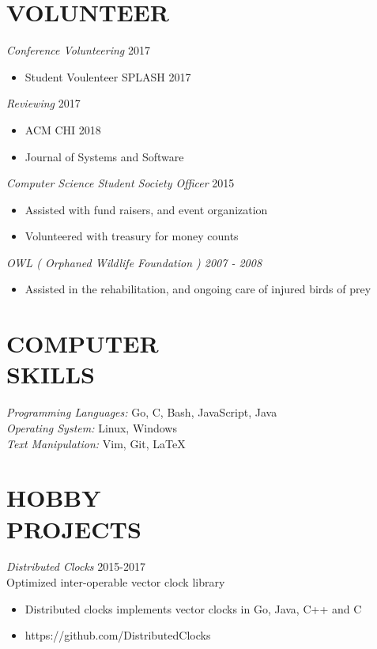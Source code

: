 \documentclass[line,margin]{res}
\begin{document}
\begin{resume}
\section{VOLUNTEER}

{\sl Conference Volunteering} \hfill 2017
    \begin{itemize}
        \item Student Voulenteer SPLASH 2017
    \end{itemize}

{\sl Reviewing} \hfill 2017
    \begin{itemize}
        \item ACM CHI 2018
        \item Journal of Systems and Software
    \end{itemize}

{\sl Computer Science Student Society Officer} \hfill 2015
    \begin{itemize}
        \item Assisted with fund raisers, and event organization
        \item Volunteered with treasury for money counts
    \end{itemize}

{\sl OWL ( Orphaned Wildlife Foundation ) {\hfill 2007 - 2008}
    \begin{itemize}
         \item Assisted in the rehabilitation, and ongoing care of injured birds of prey
    \end{itemize}
}
    

\section{COMPUTER \\ SKILLS} 
	{\sl Programming Languages:} Go, C, Bash, JavaScript, Java\\
	{\sl Operating System:} Linux, Windows\\
	{\sl Text Manipulation:} Vim, Git, \LaTeX \\

\section{HOBBY \\ PROJECTS}
{\sl Distributed Clocks} \hfill 2015-2017\\
    Optimized inter-operable vector clock library
\begin{itemize} \itemsep -2pt
		\item Distributed clocks implements vector clocks in Go, Java, C++ and C
		\item https://github.com/DistributedClocks
\end{itemize}


\end{resume}
\end{document}
